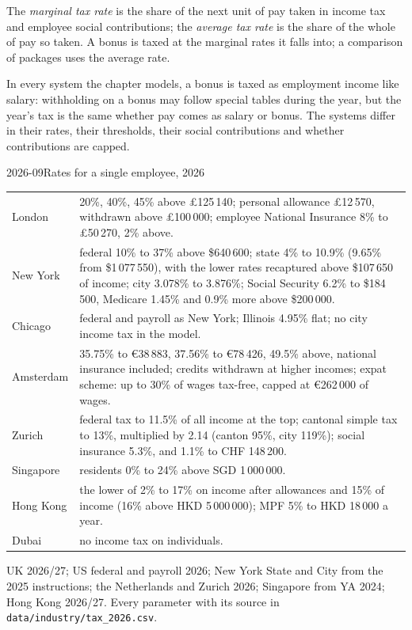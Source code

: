 \begin{definition}\label{def:in:pay-regulation-and-tax-by-location:rates}
The \emph{marginal tax rate} is the share of the next unit of pay taken in income tax and
employee social contributions; the \emph{average tax rate} is the share of the whole of pay so
taken. A bonus is taxed at the marginal rates it falls into; a comparison of packages uses the average rate.
\end{definition}

In every system the chapter models, a bonus is taxed as employment income like salary: withholding on a bonus may follow
special tables during the year, but the year's tax is the same whether pay comes as salary or bonus. The systems differ in their
rates, their thresholds, their social contributions and whether contributions are capped.

\begin{dated}{2026-09}{Rates for a single employee, 2026}\label{dat:in:pay-regulation-and-tax-by-location:rates}
\footnotesize
\begin{tabular}{@{}p{2.2cm}p{10.4cm}@{}}
\toprule
London & 20\%, 40\%, 45\% above \pounds125\,140; personal allowance \pounds12\,570, withdrawn above \pounds100\,000; employee
National Insurance 8\% to \pounds50\,270, 2\% above.\\
New York & federal 10\% to 37\% above \$640\,600; state 4\% to 10.9\% (9.65\% from \$1\,077\,550), with the lower rates
recaptured above \$107\,650 of income; city 3.078\% to 3.876\%; Social Security 6.2\% to \$184\,500, Medicare 1.45\% and
0.9\% more above \$200\,000.\\
Chicago & federal and payroll as New York; Illinois 4.95\% flat; no city income tax in the model.\\
Amsterdam & 35.75\% to \euro38\,883, 37.56\% to \euro78\,426, 49.5\% above, national insurance included; credits
withdrawn at higher incomes; expat scheme: up to 30\% of wages tax-free, capped at \euro262\,000 of wages.\\
Zurich & federal tax to 11.5\% of all income at the top; cantonal simple tax to 13\%, multiplied by 2.14 (canton 95\%,
city 119\%); social insurance 5.3\%, and 1.1\% to CHF 148\,200.\\
Singapore & residents 0\% to 24\% above SGD 1\,000\,000.\\
Hong Kong & the lower of 2\% to 17\% on income after allowances and 15\% of income (16\% above HKD 5\,000\,000);
MPF 5\% to HKD 18\,000 a year.\\
Dubai & no income tax on individuals.\\
\bottomrule
\end{tabular}

\smallskip\noindent UK 2026/27; US federal and payroll 2026; New York State and City from the 2025 instructions; the
Netherlands and Zurich 2026; Singapore from YA 2024; Hong Kong 2026/27. Every parameter with its source in
\texttt{data/industry/tax\_2026.csv}.
\end{dated}

